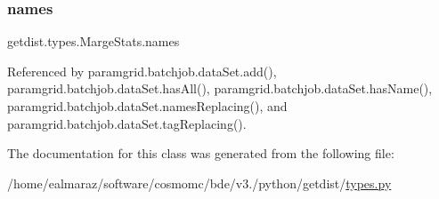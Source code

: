 \mbox{\label{classgetdist_1_1types_1_1MargeStats_ab9f94797de11f4e1b82446417f86c114}} 
\subsubsection{\texorpdfstring{names}{names}}
{\footnotesize\ttfamily getdist.\+types.\+Marge\+Stats.\+names}



Referenced by paramgrid.\+batchjob.\+data\+Set.\+add(), paramgrid.\+batchjob.\+data\+Set.\+has\+All(), paramgrid.\+batchjob.\+data\+Set.\+has\+Name(), paramgrid.\+batchjob.\+data\+Set.\+names\+Replacing(), and paramgrid.\+batchjob.\+data\+Set.\+tag\+Replacing().



The documentation for this class was generated from the following file\+:\begin{DoxyCompactItemize}
\item 
/home/ealmaraz/software/cosmomc/bde/v3./python/getdist/\mbox{\hyperlink{types_8py}{types.\+py}}\end{DoxyCompactItemize}
